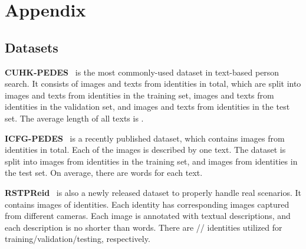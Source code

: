 \documentclass{article}
\begin{document}





\appendix
\section{Appendix}

\subsection{Datasets}
\label{datasets}
\textbf{CUHK-PEDES}~\cite{li2017person} is the most commonly-used dataset in text-based person search. It consists of  images and  texts from  identities in total, which are split into  images and  texts from  identities in the training set,  images and  texts from  identities in the validation set, and  images and  texts from  identities in the test set. The average length of all texts is . 

\noindent\textbf{ICFG-PEDES}~\cite{ding2021semantically} is a recently published dataset, which contains  images from  identities in total. Each of the images is described by one text. The dataset is split into  images from  identities in the training set, and  images from  identities in the test set. On average, there are  words for each text.

\noindent\textbf{RSTPReid}~\cite{zhu2021dssl} is also a newly released dataset to properly handle real scenarios. It contains  images of  identities. Each identity has  corresponding images captured from different cameras. Each image is annotated with  textual descriptions, and each description is no shorter than  words. There are // identities utilized for training/validation/testing, respectively.
\end{document}
